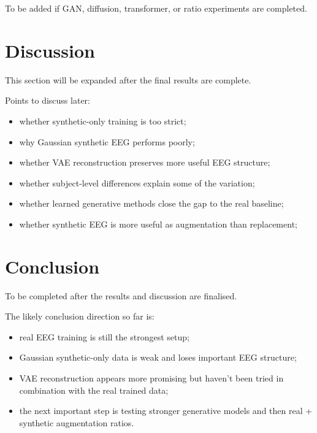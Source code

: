\documentclass[conference]{IEEEtran}
\begin{document}
To be added if GAN, diffusion, transformer, or ratio experiments are completed.

\vspace{4em}

\section{Discussion}

This section will be expanded after the final results are complete.

\vspace{0.5em}

Points to discuss later:

\begin{itemize}
\item whether synthetic-only training is too strict;
\item why Gaussian synthetic EEG performs poorly;
\item whether VAE reconstruction preserves more useful EEG structure;
\item whether subject-level differences explain some of the variation;
\item whether learned generative methods close the gap to the real baseline;
\item whether synthetic EEG is more useful as augmentation than replacement;
\end{itemize}

\vspace{2em}

\section{Conclusion}

To be completed after the results and discussion are finalised.

\vspace{0.5em}

The likely conclusion direction so far is:

\begin{itemize}
\item real EEG training is still the strongest setup;
\item Gaussian synthetic-only data is weak and loses important EEG structure;
\item VAE reconstruction appears more promising but haven't been tried in combination with the real trained data;
\item the next important step is testing stronger generative models and then real + synthetic augmentation ratios.
\end{itemize}

\vspace{2em}



\end{document}
